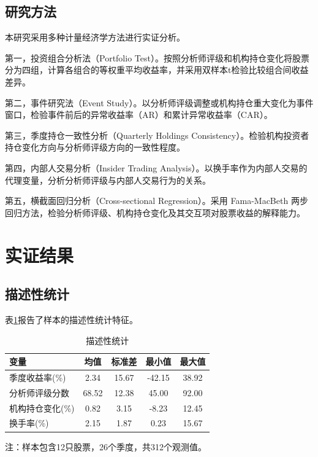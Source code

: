 \documentclass[12pt,a4paper]{article}
\begin{document}
\subsection{研究方法}

本研究采用多种计量经济学方法进行实证分析。

第一，投资组合分析法（Portfolio Test）。按照分析师评级和机构持仓变化将股票分为四组，计算各组合的等权重平均收益率，并采用双样本t检验比较组合间收益差异。

第二，事件研究法（Event Study）。以分析师评级调整或机构持仓重大变化为事件窗口，检验事件前后的异常收益率（AR）和累计异常收益率（CAR）。

第三，季度持仓一致性分析（Quarterly Holdings Consistency）。检验机构投资者持仓变化方向与分析师评级方向的一致性程度。

第四，内部人交易分析（Insider Trading Analysis）。以换手率作为内部人交易的代理变量，分析分析师评级与内部人交易行为的关系。

第五，横截面回归分析（Cross-sectional Regression）。采用 Fama-MacBeth 两步回归方法，检验分析师评级、机构持仓变化及其交互项对股票收益的解释能力。

\section{实证结果}

\subsection{描述性统计}

表\ref{tab:descriptive}报告了样本的描述性统计特征。

\begin{table}[htbp]
  \centering
  \caption{描述性统计}
  \label{tab:descriptive}
  \begin{threeparttable}
    \begin{tabular}{lcccc}
      \toprule
      \textbf{变量} & \textbf{均值} & \textbf{标准差} & \textbf{最小值} & \textbf{最大值} \\
      \midrule
      季度收益率(\%) & 2.34 & 15.67 & -42.15 & 38.92 \\
      分析师评级分数 & 68.52 & 12.38 & 45.00 & 92.00 \\
      机构持仓变化(\%) & 0.82 & 3.15 & -8.23 & 12.45 \\
      换手率(\%) & 2.15 & 1.87 & 0.23 & 15.67 \\
      \bottomrule
    \end{tabular}
    \begin{tablenotes}
      \footnotesize
      \item 注：样本包含12只股票，26个季度，共312个观测值。
    \end{tablenotes}
  \end{threeparttable}
\end{table}
\end{document}
